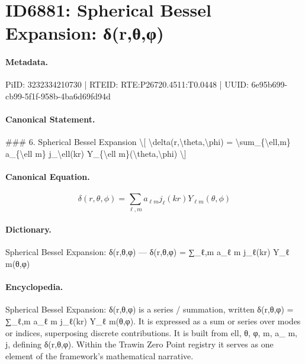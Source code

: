 \section*{ID6881: Spherical Bessel Expansion: δ(r,θ,φ)}
\paragraph{Metadata.}
PiID: 3232334210730 | RTEID: RTE:P26720.4511:T0.0448 | UUID: 6e95b699-cb99-5f1f-958b-4ba6d69fd94d

\paragraph{Canonical Statement.}
\#\#\# 6. Spherical Bessel Expansion \textbackslash{}[ \textbackslash{}delta(r,\textbackslash{}theta,\textbackslash{}phi) = \textbackslash{}sum\_\{\textbackslash{}ell,m\} a\_\{\textbackslash{}ell m\} j\_\textbackslash{}ell(kr) Y\_\{\textbackslash{}ell m\}(\textbackslash{}theta,\textbackslash{}phi) \textbackslash{}]

\paragraph{Canonical Equation.}
\[
\delta(r,\theta,\phi) = \sum_{\ell,m} a_{\ell m} j_\ell(kr) Y_{\ell m}(\theta,\phi)
\]

\paragraph{Dictionary.}
Spherical Bessel Expansion: δ(r,θ,φ) — δ(r,θ,φ) = ∑\_ℓ,m a\_ℓ m j\_ℓ(kr) Y\_ℓ m(θ,φ)

\paragraph{Encyclopedia.}
Spherical Bessel Expansion: δ(r,θ,φ) is a series / summation, written δ(r,θ,φ) = ∑\_ℓ,m a\_ℓ m j\_ℓ(kr) Y\_ℓ m(θ,φ). It is expressed as a sum or series over modes or indices, superposing discrete contributions. It is built from ell, θ, φ, m, a\_ m, j, defining δ(r,θ,φ). Within the Trawin Zero Point registry it serves as one element of the framework's mathematical narrative.
